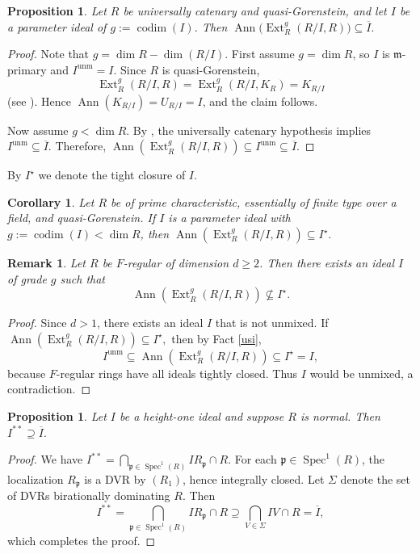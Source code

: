 \documentclass[11pt,a4paper]{amsart}
\numberwithin{equation}{section}
\newtheorem{proposition}[theorem]{Proposition}
\newtheorem{corollary}[theorem]{Corollary}
\newtheorem{remark}[theorem]{Remark}
\DeclareMathOperator{\codim}{codim}
\DeclareMathOperator{\Ann}{Ann}\DeclareMathOperator{\ann}{Ann}
\DeclareMathOperator{\unm}{unm}
\DeclareMathOperator{\Spec}{Spec}
\DeclareMathOperator{\Ext}{Ext}
\newcommand{\fm}{\mathfrak{m}}
\newcommand{\fp}{\mathfrak{p}}
\begin{document}
\begin{proposition}\label{2.8}
	Let $R$ be universally catenary and quasi-Gorenstein, and let $I$ be a parameter ideal of $g:=\codim(I)$. Then
	\(
	\Ann\!\bigl(\Ext^g_R(R/I, R)\bigr) \subseteq \overline{I}.
	\)
\end{proposition}

\begin{proof}
	Note that $g=\dim R-\dim(R/I)$. First assume $g=\dim R$, so $I$ is $\fm$-primary and $I^{\unm}=I$. Since $R$ is quasi-Gorenstein,
	\[
	\Ext^g_R(R/I, R)=\Ext^g_R(R/I, K_R)=K_{R/I}
	\]
	(see \cite{Ao}). Hence $\Ann(K_{R/I})=U_{R/I}=I$, and the claim follows.
	
	Now assume $g<\dim R$. By \cite[Ex.\ 10.11]{Hut}, the universally catenary hypothesis implies $I^{\unm}\subseteq\overline{I}$. Therefore,
	\(
	\Ann(\Ext^g_R(R/I, R)) \subseteq I^{\unm} \subseteq \overline{I}.
	\)
\end{proof}

By $I^\star$ we denote the tight closure of $I$.

\begin{corollary}
	Let $R$ be of prime characteristic, essentially of finite type over a field, and quasi-Gorenstein. If $I$ is a parameter ideal with $g:=\codim(I)<\dim R$, then
	\(
	\Ann(\Ext^g_R(R/I, R)) \subseteq I^\star.
	\)
\end{corollary}

\begin{remark}
	Let $R$ be $F$-regular of dimension $d\ge 2$. Then there exists an ideal $I$ of grade $g$ such that
	\[
	\Ann(\Ext^g_R(R/I, R)) \nsubseteq I^\star.
	\]
\end{remark}

\begin{proof}
	Since $d>1$, there exists an ideal $I$ that is not unmixed. If
	\(
	\Ann(\Ext^g_R(R/I, R)) \subseteq I^\star,
	\)
	then by Fact \ref{usi},
	\[
	I^{\unm}\subseteq \Ann(\Ext^g_R(R/I, R)) \subseteq I^\star = I,
	\]
	because $F$-regular rings have all ideals tightly closed. Thus $I$ would be unmixed, a contradiction.
\end{proof}

\begin{proposition}
	Let $I$ be a height-one ideal and suppose $R$ is normal. Then
	\(
	I^{**} \supseteq \overline{I}.
	\)
\end{proposition}

\begin{proof}
	We have
	\(
	I^{**} = \bigcap_{\fp\in \Spec^1(R)} IR_{\fp} \cap R.
	\)
	For each $\fp\in\Spec^1(R)$, the localization $R_{\fp}$ is a DVR by $(R_1)$, hence integrally closed. Let $\Sigma$ denote the set of DVRs birationally dominating $R$. Then
	\[
	I^{**} = \bigcap_{\fp\in \Spec^1(R)} IR_{\fp} \cap R
	\supseteq \bigcap_{V\in\Sigma} IV \cap R
	= \overline{I},
	\]
	which completes the proof.
\end{proof} 
	\maketitle
\end{document}
